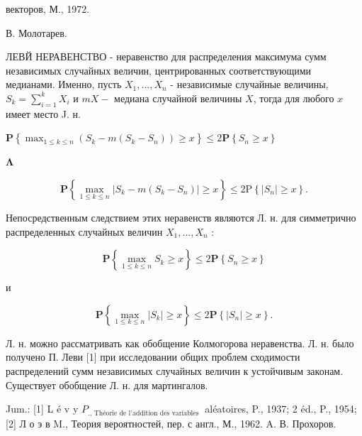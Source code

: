 \documentclass[10pt]{article}
\begin{document}
векторов, М., 1972.

В. Молотарев.



ЛЕВЙ НЕРАВЕНСТВО - неравенство для распределения максимума сумм независимых случайных величин, центрированных соответствующими медианами. Именно, пусть $X_{1}, \ldots, X_{n}$ - независимые случайные величины, $S_{k}=\sum_{i=1}^{k} X_{i}$ и $m X-$ медиана случайной величины $X$, тогда для любого $x$ имеет место J. н.



$\mathbf{P}\left\{\max _{1 \leqslant k \leqslant n}\left(S_{k}-m\left(S_{k}-S_{n}\right)\right) \geqslant x\right\} \leqslant 2 \mathbf{P}\left\{S_{n} \geqslant x\right\}$



$\boldsymbol{\Lambda}$



\[

\mathbf{P}\left\{\max _{1 \leqslant k \leqslant n}\left|S_{k}-m\left(S_{k}-S_{n}\right)\right| \geqslant x\right\} \leqslant 2 \mathrm{P}\left\{\left|S_{n}\right| \geqslant x\right\} .

\]



Непосредственным следствием этих неравенств являются Л. н. для симметрично распределенных случайных величин $X_{1}, \ldots, X_{n}$ :



\[

\mathbf{P}\left\{\max _{1 \leqslant k \leqslant n} S_{k} \geqslant x\right\} \leqslant 2 \mathbf{P}\left\{S_{n} \geqslant x\right\}

\]



и



\[

\mathbf{P}\left\{\max _{1 \leqslant k \leqslant n}\left|S_{k}\right| \geqslant x\right\} \leqslant 2 \mathbf{P}\left\{\left|S_{n}\right| \geqslant x\right\} .

\]



Л. н. можно рассматривать как обобщение Колмогорова неравенства. Л. н. было получено П. Леви [1] при исследовании общих проблем сходимости распределений сумм независимых случайных величин к устойчивым законам. Существует обобщение Л. н. для мартингалов.



Jum.: [1] L é v y $P_{\text {., Théorie de l'addition des variables }}$ aléatoires, P., 1937; 2 éd., P., 1954; [2] Л о э в M., Теория вероятностей, пер. с англ., М., 1962. A. В. Прохоров.
\end{document}
